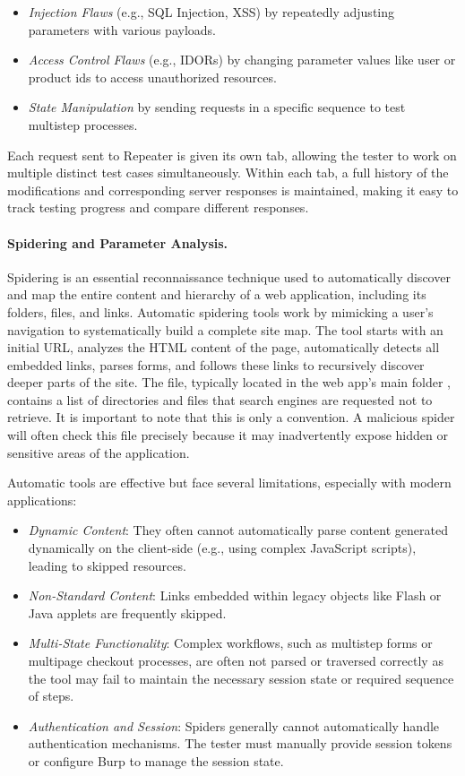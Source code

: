 \begin{itemize}
    \item \textit{Injection Flaws} (e.g., SQL Injection, XSS) by repeatedly adjusting parameters with various payloads.
    \item \textit{Access Control Flaws} (e.g., IDORs) by changing parameter values like user or product ids to access unauthorized resources.
    \item \textit{State Manipulation} by sending requests in a specific sequence to test multistep processes.
\end{itemize}

Each request sent to Repeater is given its own tab, allowing the tester to work on multiple distinct test cases simultaneously. Within each tab, a full history of the modifications and corresponding server responses is maintained, making it easy to track testing progress and compare different responses.

\paragraph{Spidering and Parameter Analysis.} Spidering is an essential reconnaissance technique used to automatically discover and map the entire content and hierarchy of a web application, including its folders, files, and links. Automatic spidering tools work by mimicking a user's navigation to systematically build a complete site map. The tool starts with an initial URL, analyzes the HTML content of the page, automatically detects all embedded links, parses forms, and follows these links to recursively discover deeper parts of the site. The  file, typically located in the web app's main folder , contains a list of directories and files that search engines are requested not to retrieve. It is important to note that this is only a convention. A malicious spider will often check this file precisely because it may inadvertently expose hidden or sensitive areas of the application.

Automatic tools are effective but face several limitations, especially with modern applications:

\begin{itemize}
    \item \textit{Dynamic Content}: They often cannot automatically parse content generated dynamically on the client-side (e.g., using complex JavaScript scripts), leading to skipped resources.
    \item \textit{Non-Standard Content}: Links embedded within legacy objects like Flash or Java applets are frequently skipped.
    \item \textit{Multi-State Functionality}: Complex workflows, such as multistep forms or multipage checkout processes, are often not parsed or traversed correctly as the tool may fail to maintain the necessary session state or required sequence of steps.
    \item \textit{Authentication and Session}: Spiders generally cannot automatically handle authentication mechanisms. The tester must manually provide session tokens or configure Burp to manage the session state.
\end{itemize}

